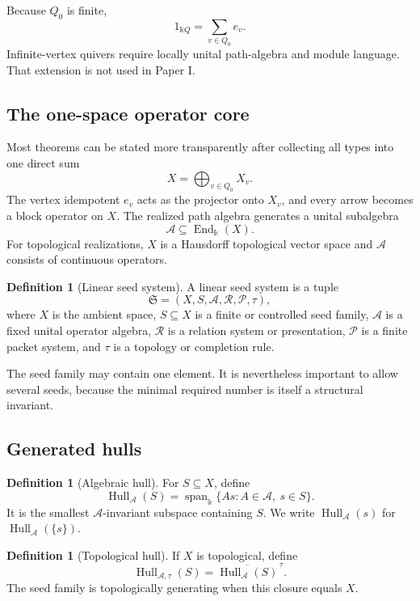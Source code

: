 \documentclass[11pt]{article}
\theoremstyle{definition}
\newtheorem{definition}[theorem]{Definition}
\theoremstyle{remark}
\newcommand{\Seed}{\mathfrak S}
\newcommand{\cA}{\mathcal A}
\newcommand{\cR}{\mathcal R}
\newcommand{\cP}{\mathcal P}
\newcommand{\Hull}{\operatorname{Hull}}
\newcommand{\Span}{\operatorname{span}}
\newcommand{\End}{\operatorname{End}}
\newcommand{\bbk}{\mathbb{k}}
\newcommand{\closure}[1]{\overline{#1}}
\begin{document}
Because $Q_0$ is finite,
\[
1_{\bbk Q}=\sum_{v\in Q_0}e_v.
\]
Infinite-vertex quivers require locally unital path-algebra and module language. That extension is not used in Paper I.

\subsection{The one-space operator core}

Most theorems can be stated more transparently after collecting all types into one direct sum
\[
X=\bigoplus_{v\in Q_0}X_v.
\]
The vertex idempotent $e_v$ acts as the projector onto $X_v$, and every arrow becomes a block operator on $X$. The realized path algebra generates a unital subalgebra
\[
\cA\subseteq\End_{\bbk}(X).
\]
For topological realizations, $X$ is a Hausdorff topological vector space and $\cA$ consists of continuous operators.

\begin{definition}[Linear seed system]
A linear seed system is a tuple
\[
{
\Seed=(X,S,\cA,\cR,\cP,\tau),
}
\]
where $X$ is the ambient space, $S\subseteq X$ is a finite or controlled seed family, $\cA$ is a fixed unital operator algebra, $\cR$ is a relation system or presentation, $\cP$ is a finite packet system, and $\tau$ is a topology or completion rule.
\end{definition}

The seed family may contain one element. It is nevertheless important to allow several seeds, because the minimal required number is itself a structural invariant.

\subsection{Generated hulls}

\begin{definition}[Algebraic hull]
For $S\subseteq X$, define
\[
\Hull_{\cA}(S)
=
\Span_{\bbk}\{As:A\in\cA,\ s\in S\}.
\]
It is the smallest $\cA$-invariant subspace containing $S$. We write $\Hull_{\cA}(s)$ for $\Hull_{\cA}(\{s\})$.
\end{definition}

\begin{definition}[Topological hull]
If $X$ is topological, define
\[
\Hull_{\cA,\tau}(S)
=
\closure{\Hull_{\cA}(S)}^{\,\tau}.
\]
The seed family is topologically generating when this closure equals $X$.
\end{definition}
\end{document}
